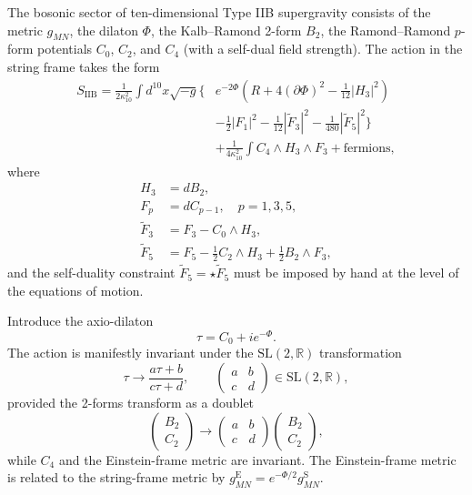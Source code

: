 \documentclass[11pt]{article}
\begin{document}
The bosonic sector of ten-dimensional Type IIB supergravity consists of the metric $g_{MN}$, the dilaton $\Phi$, the Kalb--Ramond 2-form $B_2$, the Ramond--Ramond $p$-form potentials $C_0$, $C_2$, and $C_4$ (with a self-dual field strength). The action in the string frame takes the form
\begin{equation}
\begin{aligned}
S_{\text{IIB}} = \frac{1}{2\kappa_{10}^2} \int d^{10}x \sqrt{-g} \Biggl\{
&e^{-2\Phi} \left( R + 4 (\partial \Phi)^2 - \frac{1}{12} |H_3|^2 \right) \\
&- \frac{1}{2} |F_1|^2 - \frac{1}{12} |\widetilde{F}_3|^2 - \frac{1}{480} |\widetilde{F}_5|^2 \Biggr\} \\
&+ \frac{1}{4\kappa_{10}^2} \int C_4 \wedge H_3 \wedge F_3 + \text{fermions},
\end{aligned}
\end{equation}
where
\begin{align}
H_3 &= d B_2, \\
F_p &= d C_{p-1}, \quad p=1,3,5, \\
\widetilde{F}_3 &= F_3 - C_0 \wedge H_3, \\
\widetilde{F}_5 &= F_5 - \frac{1}{2} C_2 \wedge H_3 + \frac{1}{2} B_2 \wedge F_3,
\end{align}
and the self-duality constraint $\widetilde{F}_5 = \star \widetilde{F}_5$ must be imposed by hand at the level of the equations of motion.

Introduce the axio-dilaton
\begin{equation}
\tau = C_0 + i e^{-\Phi}.
\end{equation}
The action is manifestly invariant under the $\mathrm{SL}(2,\mathbb{R})$ transformation
\begin{equation}
\tau \to \frac{a\tau + b}{c\tau + d}, \qquad 
\begin{pmatrix} a & b \\ c & d \end{pmatrix} \in \mathrm{SL}(2,\mathbb{R}),
\end{equation}
provided the 2-forms transform as a doublet
\begin{equation}
\begin{pmatrix} B_2 \\ C_2 \end{pmatrix} \to 
\begin{pmatrix} a & b \\ c & d \end{pmatrix} \begin{pmatrix} B_2 \\ C_2 \end{pmatrix},
\end{equation}
while $C_4$ and the Einstein-frame metric are invariant. The Einstein-frame metric is related to the string-frame metric by $g_{MN}^{\text{E}} = e^{-\Phi/2} g_{MN}^{\text{S}}$.
\end{document}
